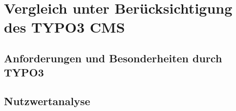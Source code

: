 \newpage
\section{Vergleich unter Berücksichtigung des TYPO3 CMS}
\subsection{Anforderungen und Besonderheiten durch TYPO3}
\subsection{Nutzwertanalyse}